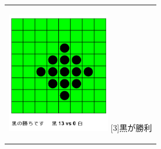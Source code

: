 \documentclass[10.5pt, a4paper]{jsarticle}
\begin{document}
\begin{figure}[htbp]
\begin{center}
\begin{tabular}{c}
      \begin{minipage}{0.33\hsize}
        \begin{center}
          \includegraphics[clip, width=4.5cm]{./image/img03.png}
          \hspace{1.6cm} [3]黒が勝利
        \end{center}
      \end{minipage}

    \end{tabular}
  \end{center}
\end{figure}
\end{document}
